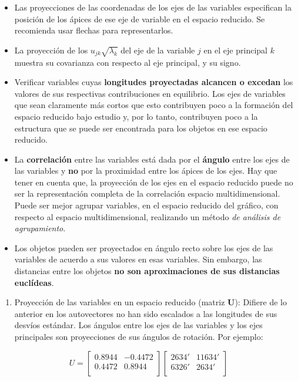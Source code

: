 \documentclass[]{book}
\providecommand{\tightlist}{%
  \setlength{\itemsep}{0pt}\setlength{\parskip}{0pt}}
\theoremstyle{definition}
\theoremstyle{definition}
\theoremstyle{definition}
\theoremstyle{remark}
\begin{document}
\begin{itemize}
\item
  Las proyecciones de las coordenadas de los ejes de las variables
  especifican la posición de los ápices de ese eje de variable en el
  espacio reducido. Se recomienda usar flechas para representarlos.
\item
  La proyección de los \(u_{jk}\sqrt{\lambda_{k}}\) del eje de la
  variable \(j\) en el eje principal \(k\) muestra su covarianza con
  respecto al eje principal, y su signo.
\item
  Verificar variables cuyas \textbf{longitudes proyectadas alcancen o
  excedan} los valores de sus respectivas contribuciones en equilibrio.
  Los ejes de variables que sean claramente más cortos que esto
  contribuyen poco a la formación del espacio reducido bajo estudio y,
  por lo tanto, contribuyen poco a la estructura que se puede ser
  encontrada para los objetos en ese espacio reducido.
\item
  La \textbf{correlación} entre las variables está dada por el
  \textbf{ángulo} entre los ejes de las variables y \textbf{no} por la
  proximidad entre los ápices de los ejes. Hay que tener en cuenta que,
  la proyección de los ejes en el espacio reducido puede no ser la
  representación completa de la correlación espacio multidimensional.
  Puede ser mejor agrupar variables, en el espacio reducido del gráfico,
  con respecto al espacio multidimensional, realizando un método
  \emph{de análisis de agrupamiento}.
\item
  Los objetos pueden ser proyectados en ángulo recto sobre los ejes de
  las variables de acuerdo a sus valores en esas variables. Sin embargo,
  las distancias entre los objetos \textbf{no son aproximaciones de sus
  distancias euclídeas}.
\end{itemize}

\begin{enumerate}
\def\labelenumi{\arabic{enumi}.}
\tightlist
\item
  Proyección de las variables en un espacio reducido (matriz
  \(\mathbf{U}\)): Difiere de lo anterior en los autovectores no han
  sido escalados a las longitudes de sus desvíos estándar. Los ángulos
  entre los ejes de las variables y los ejes principales son
  proyecciones de sus ángulos de rotación. Por ejemplo:
\end{enumerate}

\[
U = \begin{bmatrix}
0.8944 & - 0.4472 \\
0.4472 & 0.8944 \\
\end{bmatrix}\begin{bmatrix}
2634' & 11634' \\
6326' & 2634' \\
\end{bmatrix}
\]
\end{document}

